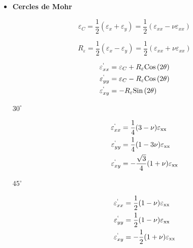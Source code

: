 \documentclass
[
a4paper,                      %
twoside,					  %
12pt,                         %
abstract,		      %
fleqn,                        %
]
{scrartcl} %
\begin{document}
\begin{enumerate}
\begin{itemize}
\begin{description}
\end{description}

\item \textbf{Cercles de Mohr}

\begin{equation}
\varepsilon_{C}=\frac{1}{2} \left(\varepsilon _{x}+  \varepsilon _{y}\right)=\frac{1}{2} \left(\varepsilon _{xx}-\nu  \varepsilon _{xx}\right)
\end{equation}

\begin{equation}
R_{\varepsilon}=\frac{1}{2} \left(\varepsilon _{x}-  \varepsilon _{y}\right)=\frac{1}{2} \left(\varepsilon _{xx}+\nu  \varepsilon _{xx}\right)
\end{equation}

\begin{equation}
\begin{aligned}
\varepsilon_{xx}^{`}&=\varepsilon_{C}+R_{\varepsilon} \text{Cos}\left(2\theta\right) \\
\varepsilon_{yy}^{`}&=\varepsilon_{C}-R_{\varepsilon} \text{Cos}\left(2\theta\right) \\
\varepsilon_{xy}^{`}&=-R_{\varepsilon} \text{Sin}\left(2\theta\right) \\
\end{aligned}
\end{equation}

\begin{description}
\item [$30^{\circ}$]

\begin{equation}
\begin{aligned}
\varepsilon_{xx}^{`}&=\frac{1}{4} (3-\nu ) \varepsilon _{\text{xx}} \\
\varepsilon_{yy}^{`}&= \frac{1}{4} (1-3 \nu ) \varepsilon _{\text{xx}}  \\
\varepsilon_{xy}^{`}&=-\frac{ \sqrt{3} }{4}(1+\nu ) \varepsilon _{\text{xx}} \\
\end{aligned}
\end{equation}

\item [$45^{\circ}$]

\begin{equation}
\begin{aligned}
\varepsilon_{xx}^{`}&=\frac{1}{2} (1-\nu ) \varepsilon _{\text{xx}} \\
\varepsilon_{yy}^{`}&=\frac{1}{2} (1-\nu ) \varepsilon _{\text{xx}} \\
\varepsilon_{xy}^{`}&=-\frac{1}{2} (1+\nu ) \varepsilon _{\text{xx}} \\
\end{aligned}
\end{equation}


\end{description}
\end{itemize}
\end{enumerate}
\end{document}
